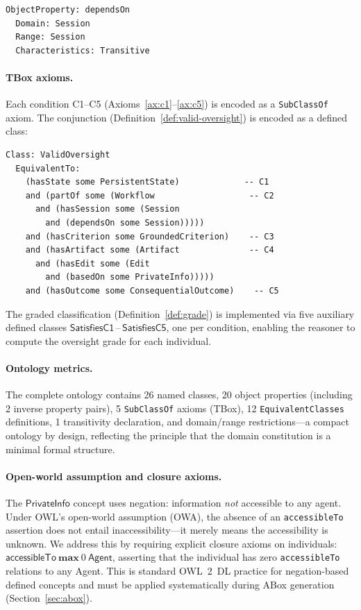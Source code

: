 \documentclass[11pt]{article}
\begin{document}
\begin{small}
\begin{verbatim}
ObjectProperty: dependsOn
  Domain: Session
  Range: Session
  Characteristics: Transitive
\end{verbatim}
\end{small}

\paragraph{TBox axioms.}
Each condition C1--C5 (Axioms~\ref{ax:c1}--\ref{ax:c5}) is encoded as a \texttt{SubClassOf} axiom.
The conjunction (Definition~\ref{def:valid-oversight}) is encoded as a defined class:

\begin{small}
\begin{verbatim}
Class: ValidOversight
  EquivalentTo:
    (hasState some PersistentState)             -- C1
    and (partOf some (Workflow                   -- C2
      and (hasSession some (Session
        and (dependsOn some Session)))))
    and (hasCriterion some GroundedCriterion)    -- C3
    and (hasArtifact some (Artifact              -- C4
      and (hasEdit some (Edit
        and (basedOn some PrivateInfo)))))
    and (hasOutcome some ConsequentialOutcome)    -- C5
\end{verbatim}
\end{small}

The graded classification (Definition~\ref{def:grade}) is implemented via five auxiliary defined classes $\mathsf{SatisfiesC1}$\,--\,$\mathsf{SatisfiesC5}$, one per condition, enabling the reasoner to compute the oversight grade for each individual.

\paragraph{Ontology metrics.}
The complete ontology contains 26 named classes, 20 object properties (including 2 inverse property pairs), 5 \texttt{SubClassOf} axioms (TBox), 12 \texttt{EquivalentClasses} definitions, 1 transitivity declaration, and domain/range restrictions---a compact ontology by design, reflecting the principle that the domain constitution is a minimal formal structure.

\paragraph{Open-world assumption and closure axioms.}
The $\mathsf{PrivateInfo}$ concept uses negation: information \emph{not} accessible to any agent.
Under OWL's open-world assumption (OWA), the absence of an \texttt{accessibleTo} assertion does not entail inaccessibility---it merely means the accessibility is unknown.
We address this by requiring explicit closure axioms on individuals: $\mathsf{accessibleTo}\ \textbf{max}\ 0\ \mathsf{Agent}$, asserting that the individual has zero \texttt{accessibleTo} relations to any Agent.
This is standard OWL~2~DL practice for negation-based defined concepts and must be applied systematically during ABox generation (Section~\ref{sec:abox}).
\end{document}
